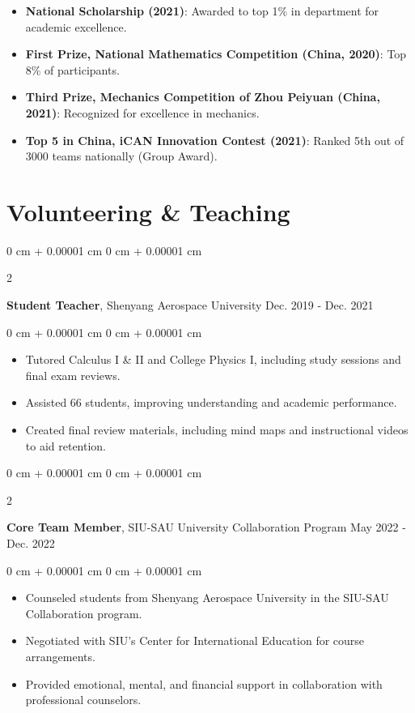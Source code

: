 \documentclass[10pt, letterpaper]{article}
\newenvironment{highlights}{
    \begin{itemize}[
        topsep=0.10 cm,
        parsep=0.10 cm,
        partopsep=0pt,
        itemsep=0pt,
        leftmargin=0 cm + 10pt
    ]
}{
    \end{itemize}
} %
\newenvironment{onecolentry}{
    \begin{adjustwidth}{
        0 cm + 0.00001 cm
    }{
        0 cm + 0.00001 cm
    }
}{
    \end{adjustwidth}
} %
\newenvironment{twocolentry}[2][]{
    \onecolentry
    \def\secondColumn{#2}
    \setcolumnwidth{\fill, 4.5 cm}
    \begin{paracol}{2}
}{ 
    \switchcolumn \raggedleft \secondColumn
    \end{paracol}
    \endonecolentry
} %
\begin{document}
    \begin{highlights}
        \item \textbf{National Scholarship (2021)}: Awarded to top 1\% in department for academic excellence.
        \item \textbf{First Prize, National Mathematics Competition (China, 2020)}: Top 8\% of participants.
        \item \textbf{Third Prize, Mechanics Competition of Zhou Peiyuan (China, 2021)}: Recognized for excellence in mechanics.
        \item \textbf{Top 5 in China, iCAN Innovation Contest (2021)}: Ranked 5th out of 3000 teams nationally (Group Award).
    \end{highlights}

    \vspace{0.2 cm}

    \section{Volunteering \& Teaching}

    \begin{twocolentry}{
        Dec. 2019 - Dec. 2021
    }
        \textbf{Student Teacher}, Shenyang Aerospace University\end{twocolentry}

    \vspace{0.10 cm}
    \begin{onecolentry}
        \begin{highlights}
            \item Tutored Calculus I \& II and College Physics I, including study sessions and final exam reviews.
            \item Assisted 66 students, improving understanding and academic performance.
            \item Created final review materials, including mind maps and instructional videos to aid retention.
        \end{highlights}
    \end{onecolentry}

    \vspace{0.2 cm}

    \begin{twocolentry}{
        May 2022 - Dec. 2022
    }
        \textbf{Core Team Member}, SIU-SAU University Collaboration Program\end{twocolentry}

    \vspace{0.10 cm}
    \begin{onecolentry}
        \begin{highlights}
            \item Counseled students from Shenyang Aerospace University in the SIU-SAU Collaboration program.
            \item Negotiated with SIU's Center for International Education for course arrangements.
            \item Provided emotional, mental, and financial support in collaboration with professional counselors.
        \end{highlights}
    \end{onecolentry}
\end{document}
